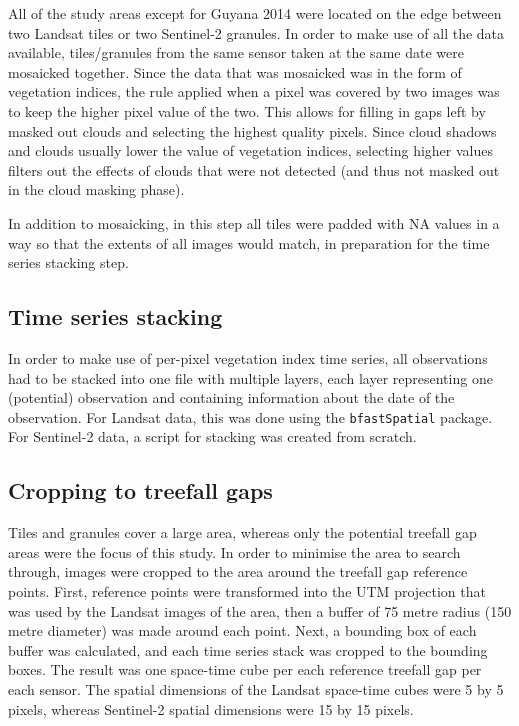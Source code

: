 \documentclass[a4paper,12pt]{scrbook}
\begin{document}
All of the study areas except for Guyana 2014 were located on the edge between two Landsat tiles or two Sentinel-2 granules. In order to make use of all the data available, tiles/granules from the same sensor taken at the same date were mosaicked together. Since the data that was mosaicked was in the form of vegetation indices, the rule applied when a pixel was covered by two images was to keep the higher pixel value of the two. This allows for filling in gaps left by masked out clouds and selecting the highest quality pixels. Since cloud shadows and clouds usually lower the value of vegetation indices, selecting higher values filters out the effects of clouds that were not detected (and thus not masked out in the cloud masking phase).

In addition to mosaicking, in this step all tiles were padded with \ac{NA} values in a way so that the extents of all images would match, in preparation for the time series stacking step.

\subsection{Time series stacking}

In order to make use of per-pixel vegetation index time series, all observations had to be stacked into one file with multiple layers, each layer representing one (potential) observation and containing information about the date of the observation. For Landsat data, this was done using the \texttt{bfastSpatial} package. For Sentinel-2 data, a script for stacking was created from scratch.

\subsection{Cropping to treefall gaps}

Tiles and granules cover a large area, whereas only the potential treefall gap areas were the focus of this study. In order to minimise the area to search through, images were cropped to the area around the treefall gap reference points. First, reference points were transformed into the \ac{UTM} projection that was used by the Landsat images of the area, then a buffer of 75 metre radius (150 metre diameter) was made around each point. Next, a bounding box of each buffer was calculated, and each time series stack was cropped to the bounding boxes. The result was one space-time cube per each reference treefall gap per each sensor. The spatial dimensions of the Landsat space-time cubes were 5 by 5 pixels, whereas Sentinel-2 spatial dimensions were 15 by 15 pixels.
\end{document}
